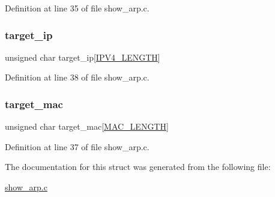 Definition at line 35 of file show\+\_\+arp.\+c.

\hypertarget{structarp__header_a7357fb5e2df0b32e297caf95618fcc73}{}\label{structarp__header_a7357fb5e2df0b32e297caf95618fcc73} 
\subsubsection{\texorpdfstring{target\+\_\+ip}{target\_ip}}
{\footnotesize\ttfamily unsigned char target\+\_\+ip\mbox{[}\hyperlink{show__arp_8c_a9935c761f5e47454f667f0d5e4208e89}{I\+P\+V4\+\_\+\+L\+E\+N\+G\+TH}\mbox{]}}



Definition at line 38 of file show\+\_\+arp.\+c.

\hypertarget{structarp__header_a3b66dfb45363fee0dc6e5e1a6d6c5156}{}\label{structarp__header_a3b66dfb45363fee0dc6e5e1a6d6c5156} 
\subsubsection{\texorpdfstring{target\+\_\+mac}{target\_mac}}
{\footnotesize\ttfamily unsigned char target\+\_\+mac\mbox{[}\hyperlink{show__arp_8c_ac941b6796b26d46622ba39ad70667ed3}{M\+A\+C\+\_\+\+L\+E\+N\+G\+TH}\mbox{]}}



Definition at line 37 of file show\+\_\+arp.\+c.



The documentation for this struct was generated from the following file\+:\begin{DoxyCompactItemize}
\item 
\hyperlink{show__arp_8c}{show\+\_\+arp.\+c}\end{DoxyCompactItemize}
